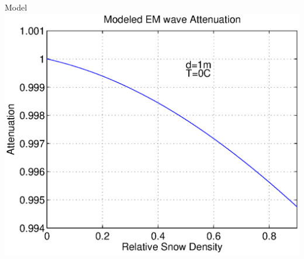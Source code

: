 \documentclass{beamer}
\begin{document}
\begin{frame}{Model}
  \includegraphics[width=1\linewidth]{model_2.eps}
\end{frame}
\end{document}
